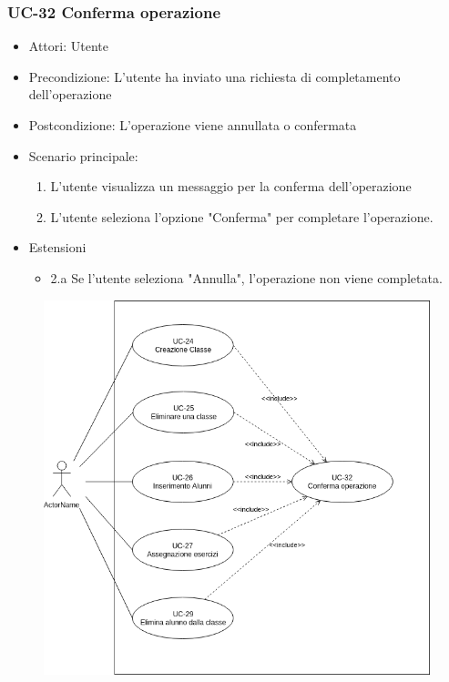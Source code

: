 \subsubsection{UC-32 Conferma operazione}		
\begin{itemize}
	\item Attori: Utente
	\item Precondizione: L'utente ha inviato una richiesta di completamento dell'operazione
	\item Postcondizione: L'operazione viene annullata o confermata
	\item Scenario principale:
	\begin{enumerate}
		\item L'utente visualizza un messaggio per la conferma dell'operazione
		\item L'utente seleziona l'opzione "Conferma" per completare l'operazione.
	\end{enumerate}		
	\item Estensioni
		\begin{itemize}
			\item 2.a Se l'utente seleziona "Annulla", l'operazione non viene completata.
		\end{itemize}
\end{itemize}

\begin{figure}[h]
	\centering
	\includegraphics[scale=0.7]{images/UC-32.png}
\end{figure}
